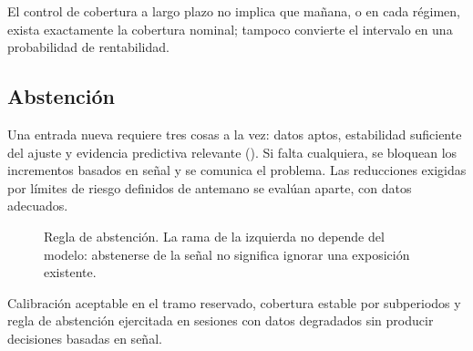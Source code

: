 


\begin{noconcluir}
El control de cobertura a largo plazo no implica que mañana, o en cada régimen, exista exactamente la
cobertura nominal; tampoco convierte el intervalo en una probabilidad de rentabilidad.
\end{noconcluir}

\subsection{Abstención}\label{sec:abstencion}

Una entrada nueva requiere tres cosas a la vez: datos aptos, estabilidad suficiente del ajuste y evidencia
predictiva relevante (). Si falta cualquiera, se bloquean los incrementos basados
en señal y se comunica el problema. Las reducciones exigidas por límites de riesgo definidos de antemano se
evalúan aparte, con datos adecuados.

\begin{figure}[H]
\centering
\resizebox{0.92\linewidth}{!}{}
\caption{Regla de abstención. La rama de la izquierda no depende del modelo: abstenerse de la señal no
significa ignorar una exposición existente.}
\label{fig:abstencion}
\end{figure}

\begin{criterio}
Calibración aceptable en el tramo reservado, cobertura estable por subperiodos y regla de abstención
ejercitada en sesiones con datos degradados sin producir decisiones basadas en señal.
\end{criterio}
